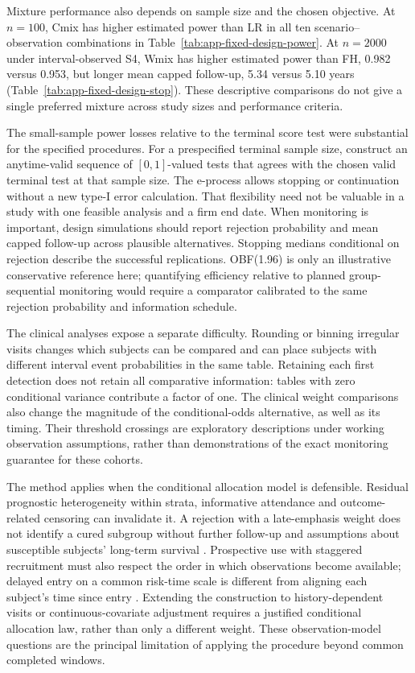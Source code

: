 \documentclass[12pt]{article}
\theoremstyle{definition}
\theoremstyle{remark}
\begin{document}
Mixture performance also depends on sample size and the chosen objective. At $n=100$, Cmix has higher estimated power than LR in all ten scenario--observation combinations in Table~\ref{tab:app-fixed-design-power}. At $n=2000$ under interval-observed S4, Wmix has higher estimated power than FH, 0.982 versus 0.953, but longer mean capped follow-up, 5.34 versus 5.10 years (Table~\ref{tab:app-fixed-design-stop}). These descriptive comparisons do not give a single preferred mixture across study sizes and performance criteria.

The small-sample power losses relative to the terminal score test were substantial for the specified procedures. For a prespecified terminal sample size, \citet{KoningVanMeer2026} construct an anytime-valid sequence of $[0,1]$-valued tests that agrees with the chosen valid terminal test at that sample size. The e-process allows stopping or continuation without a new type-I error calculation. That flexibility need not be valuable in a study with one feasible analysis and a firm end date. When monitoring is important, design simulations should report rejection probability and mean capped follow-up across plausible alternatives. Stopping medians conditional on rejection describe the successful replications. OBF(1.96) is only an illustrative conservative reference here; quantifying efficiency relative to planned group-sequential monitoring would require a comparator calibrated to the same rejection probability and information schedule.

The clinical analyses expose a separate difficulty. Rounding or binning irregular visits changes which subjects can be compared and can place subjects with different interval event probabilities in the same table. Retaining each first detection does not retain all comparative information: tables with zero conditional variance contribute a factor of one. The clinical weight comparisons also change the magnitude of the conditional-odds alternative, as well as its timing. Their threshold crossings are exploratory descriptions under working observation assumptions, rather than demonstrations of the exact monitoring guarantee for these cohorts.

The method applies when the conditional allocation model is defensible. Residual prognostic heterogeneity within strata, informative attendance and outcome-related censoring can invalidate it. A rejection with a late-emphasis weight does not identify a cured subgroup without further follow-up and assumptions about susceptible subjects' long-term survival \citep{MallerZhou1992}. Prospective use with staggered recruitment must also respect the order in which observations become available; delayed entry on a common risk-time scale is different from aligning each subject's time since entry \citep[Section~8.2]{TerSchureEtAl2024}. Extending the construction to history-dependent visits or continuous-covariate adjustment requires a justified conditional allocation law, rather than only a different weight. These observation-model questions are the principal limitation of applying the procedure beyond common completed windows.
\end{document}
